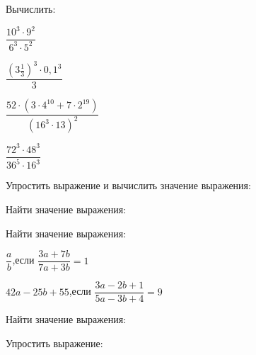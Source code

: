\begin{listofex}
	\item {}
	\item Вычислить: %
	\begin{enumcols}[itemcolumns=4]
		\item \( \dfrac{10^3\cdot9^2}{6^3\cdot5^2} \)
		\item \( \dfrac{\left( 3\frac{1}{3} \right)^3\cdot0,1^3}{3} \)
		\item \( \dfrac{52\cdot(3\cdot4^{10}+7\cdot2^{19})}{(16^3\cdot13)^2} \)
		\item \( \dfrac{72^3\cdot48^3}{36^5\cdot16^3} \)
	\end{enumcols}
	\item Упростить выражение и вычислить значение выражения: %
	\begin{enumcols}[itemcolumns=1]
		\item {}
		\item {}
	\end{enumcols}
	\item Найти значение выражения: %
	\begin{enumcols}[itemcolumns=1]
		\item {}
		\item {}
		\item {}
		\item {}
	\end{enumcols}
	\item Найти значение выражения: %
	\begin{enumcols}[itemcolumns=2]
		\item \( \dfrac{a}{b} \),\quad если \( \dfrac{3a+7b}{7a+3b}=1 \)
		\item \( 42a-25b+55 \),\quad если \( \dfrac{3a-2b+1}{5a-3b+4}=9 \)
	\end{enumcols}
	\item Найти значение выражения: %
	\begin{enumcols}[itemcolumns=2]
		\item {}
		\item {}
	\end{enumcols}
	\item Упростить выражение: %
	\begin{enumcols}[itemcolumns=2]
		\item {}
		\item {}
		\item {}
		\item {}
	\end{enumcols}
\end{listofex}